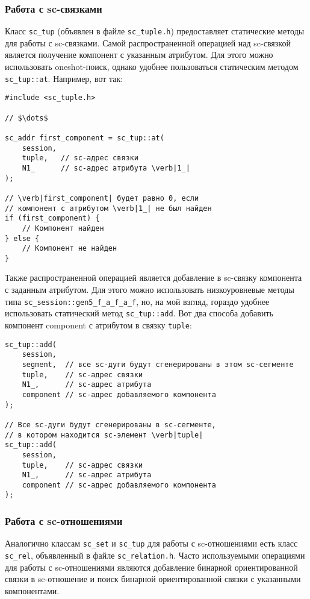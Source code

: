 \subsubsection{Работа с sc-связками}
\label{sec:libsc_sc_tup}

Класс \lstinline|sc_tup| (объявлен в файле \verb|sc_tuple.h|)
предоставляет статические методы для работы с sc-связками. Самой
распространенной операцией над sc-связкой является получение компонент
с указанным атрибутом. Для этого можно использовать oneshot-поиск,
однако удобнее пользоваться статическим методом
\lstinline|sc_tup::at|. Например, вот так:
\begin{lstlisting}[texcl]
#include <sc_tuple.h>

// $\dots$

sc_addr first_component = sc_tup::at(
    session,
    tuple,   // sc-адрес связки
    N1_      // sc-адрес атрибута \verb|1_|
);

// \verb|first_component| будет равно 0, если
// компонент с атрибутом \verb|1_| не был найден
if (first_component) {
    // Компонент найден
} else {
    // Компонент не найден
}
\end{lstlisting}

Также распространенной операцией является добавление в sc-связку
компонента с заданным атрибутом. Для этого можно использовать
низкоуровневые методы типа \lstinline|sc_session::gen5_f_a_f_a_f|, но, на мой
взгляд, гораздо удобнее использовать статический метод
\lstinline|sc_tup::add|. Вот два способа добавить компонент component с атрибутом
 в связку \lstinline|tuple|:
\begin{lstlisting}[texcl]
sc_tup::add(
    session,
    segment,  // все sc-дуги будут сгенерированы в этом sc-сегменте
    tuple,    // sc-адрес связки
    N1_,      // sc-адрес атрибута
    component // sc-адрес добавляемого компонента
);

// Все sc-дуги будут сгенерированы в sc-сегменте,
// в котором находится sc-элемент \verb|tuple|
sc_tup::add(
    session,
    tuple,    // sc-адрес связки
    N1_,      // sc-адрес атрибута
    component // sc-адрес добавляемого компонента
);
\end{lstlisting}

\subsubsection{Работа с sc-отношениями}
\label{sec:libsc_sc_rel}

Аналогично классам \lstinline|sc_set| и \lstinline|sc_tup| для работы
с sc-отношениями есть класс \lstinline|sc_rel|, объявленный в файле
\verb|sc_relation.h|. Часто используемыми операциями для работы с
sc-отношениями являются добавление бинарной ориентированной связки в
sc-отношение и поиск бинарной ориентированной связки с указанными
компонентами.

